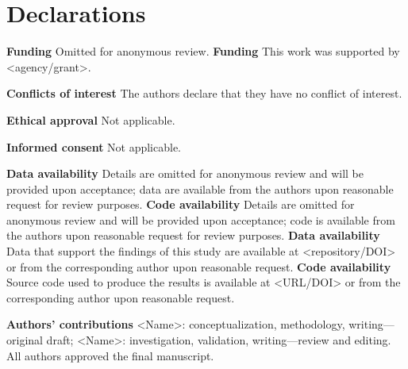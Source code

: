 \section*{Declarations}
\ifanonymous
\textbf{Funding} Omitted for anonymous review.
\else
\textbf{Funding} This work was supported by <agency/grant>.
\fi

\textbf{Conflicts of interest} The authors declare that they have no conflict of interest.

\textbf{Ethical approval} Not applicable.

\textbf{Informed consent} Not applicable.

\ifanonymous
\textbf{Data availability} Details are omitted for anonymous review and will be provided upon acceptance; data are available from the authors upon reasonable request for review purposes.
\textbf{Code availability} Details are omitted for anonymous review and will be provided upon acceptance; code is available from the authors upon reasonable request for review purposes.
\else
\textbf{Data availability} Data that support the findings of this study are available at <repository/DOI> or from the corresponding author upon reasonable request.
\textbf{Code availability} Source code used to produce the results is available at <URL/DOI> or from the corresponding author upon reasonable request.
\fi

\textbf{Authors' contributions} <Name>: conceptualization, methodology, writing—original draft; <Name>: investigation, validation, writing—review and editing. All authors approved the final manuscript.
